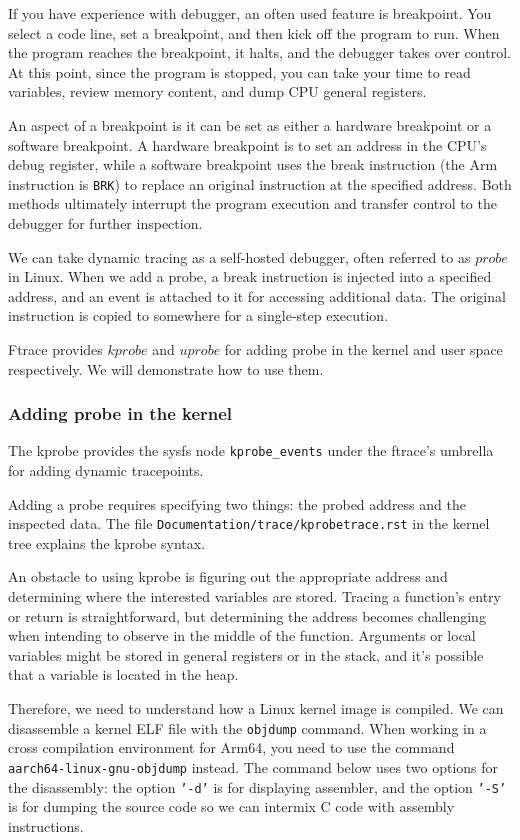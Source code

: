 \documentclass[11pt]{diazessay} %
\def\code#1{\texttt{#1}}
\begin{document}
If you have experience with debugger, an often used feature is breakpoint. You
select a code line, set a breakpoint, and then kick off the program to run.
When the program reaches the breakpoint, it halts, and the debugger takes
over control. At this point, since the program is stopped, you can take your
time to read variables, review memory content, and dump CPU general registers.

An aspect of a breakpoint is it can be set as either a hardware breakpoint or
a software breakpoint. A hardware breakpoint is to set an address in the CPU's
debug register, while a software breakpoint uses the break instruction (the
Arm instruction is \code{BRK}) to replace an original instruction at the
specified address. Both methods ultimately interrupt the program execution and
transfer control to the debugger for further inspection.

We can take dynamic tracing as a self-hosted debugger, often referred to as
\(probe\) in Linux. When we add a probe, a break instruction is injected into
a specified address, and an event is attached to it for accessing additional
data. The original instruction is copied to somewhere for a single-step
execution.

Ftrace provides \(kprobe\) and \(uprobe\) for adding probe in the kernel and
user space respectively. We will demonstrate how to use them.

\subsubsection*{Adding probe in the kernel}

The kprobe provides the sysfs node \code{kprobe\_events} under the
ftrace's umbrella for adding dynamic tracepoints.

Adding a probe requires specifying two things: the probed address and the
inspected data. The file \code{Documentation/trace/kprobetrace.rst}
in the kernel tree explains the kprobe syntax.

An obstacle to using kprobe is figuring out the appropriate address and
determining where the interested variables are stored. Tracing a function's
entry or return is straightforward, but determining the address becomes
challenging when intending to observe in the middle of the function.
Arguments or local variables might be stored in general registers or in the
stack, and it's possible that a variable is located in the heap.

Therefore, we need to understand how a Linux kernel image is compiled. We can
disassemble a kernel ELF file with the \code{objdump} command. When working in
a cross compilation environment for Arm64, you need to use the command
\code{aarch64-linux-gnu-objdump} instead. The command below uses two options
for the disassembly: the option \code{'-d'} is for displaying assembler, and
the option \code{'-S'} is for dumping the source code so we can intermix C
code with assembly instructions.
\end{document}
